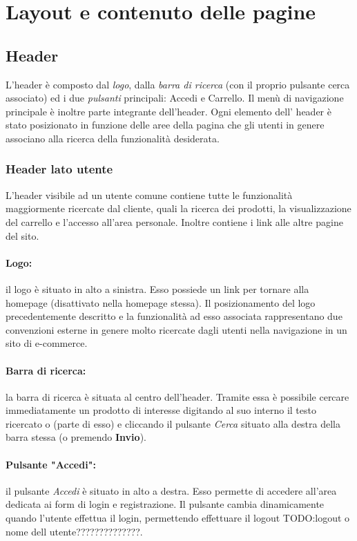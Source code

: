 \section{Layout e contenuto delle pagine}

\subsection{Header}
L'header è composto dal \textit{logo}, dalla \textit{barra di ricerca} (con il proprio pulsante cerca associato) ed i due \textit{pulsanti} principali: Accedi e Carrello. Il menù di navigazione principale è inoltre parte integrante dell'header.
Ogni elemento dell' header è stato posizionato in funzione delle aree della pagina che gli utenti in genere associano alla ricerca della funzionalità desiderata. 

\subsubsection{Header lato utente}
L'header visibile ad un utente comune contiene tutte le funzionalità maggiormente ricercate dal cliente, quali la ricerca dei prodotti, la visualizzazione del carrello e l'accesso all'area personale. Inoltre contiene i link alle altre pagine del sito.
\paragraph{Logo:}il logo è situato in alto a sinistra. Esso possiede un link per tornare alla homepage (disattivato nella homepage stessa). Il posizionamento del logo precedentemente descritto e la funzionalità ad esso associata rappresentano due convenzioni esterne in genere molto ricercate dagli utenti nella navigazione in un sito di e-commerce.

\paragraph{Barra di ricerca:}la barra di ricerca è situata al centro dell'header. Tramite essa è possibile cercare immediatamente un prodotto di interesse digitando al suo interno il testo ricercato o (parte di esso) e cliccando il pulsante \textit{Cerca} situato alla destra della barra stessa (o premendo \textbf{Invio}). 

\paragraph{Pulsante "Accedi":} il pulsante \textit{Accedi} è situato in alto a destra. Esso permette di accedere all'area dedicata ai form di login e registrazione. Il pulsante cambia dinamicamente quando l'utente effettua il login, permettendo effettuare il logout TODO:logout o nome dell utente??????????????. 

